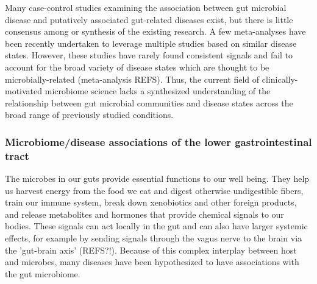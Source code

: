 \documentclass[12pt]{article}
\begin{document}
Many case-control studies examining the association between gut microbial 
disease and putatively associated gut-related diseases exist, but there
is little consensus among or synthesis of the existing research.
A few meta-analyses have been recently undertaken to leverage multiple
studies based on similar disease states. However, these studies have
rarely found consistent signals and fail to account for the broad
variety of disease states which are thought to be microbially-related
(meta-analysis REFS). Thus, the current field of clinically-motivated
microbiome science lacks a synthesized understanding of the relationship
between gut microbial communities and disease states across the broad
range of previously studied conditions.


\subsubsection{Microbiome/disease associations of the lower gastrointestinal tract}
The microbes in our guts provide essential functions to our well being. 
They help us harvest energy from the food we eat and digest otherwise 
undigestible fibers, train our immune system, break down xenobiotics and 
other foreign products, and release metabolites and hormones that provide 
chemical signals to our bodies. These signals can act locally in the gut 
and can also have larger systemic effects, for example by sending signals 
through the vagus nerve to the brain via the 'gut-brain axis' (REFS?!). 
Because of this complex interplay between host and microbes, many 
diseases have been hypothesized to have associations with the gut 
microbiome.
\end{document}

